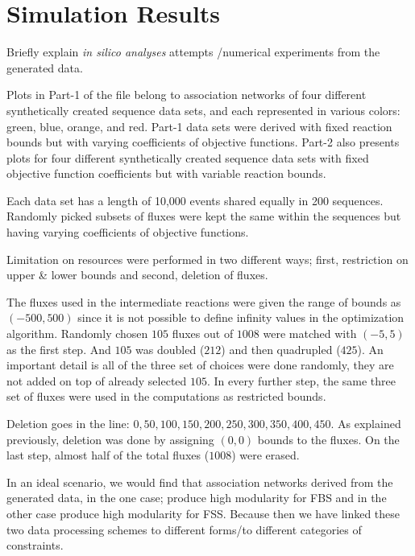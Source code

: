 \section{Simulation Results}
{\color{red} 
	
	Briefly explain \emph{in silico analyses} attempts /numerical experiments from the generated data.
	
	Plots in Part-1 of the file belong to association networks of four different synthetically created sequence data sets, and each represented in various colors: green, blue, orange, and red. Part-1 data sets were derived with fixed reaction bounds but with varying coefficients of objective functions. Part-2 also presents plots for four different synthetically created sequence data sets with fixed objective function coefficients but with variable reaction bounds.
	
	Each data set has a length of 10,000 events shared equally in 200 sequences. Randomly picked subsets of fluxes were kept the same within the sequences but having varying coefficients of objective functions.
	
	
	
	Limitation on resources were performed in two different ways; first, restriction on upper \& lower bounds and second, deletion of fluxes.
	
	The fluxes used in the intermediate reactions were given the range of bounds as $(-500, 500)$ since it is not possible to define infinity values in the optimization algorithm. Randomly chosen $105$ fluxes out of $1008$ were matched with $(-5, 5)$ as the first step. And $105$ was doubled ($212$) and then quadrupled ($425$). An important detail is all of the three set of choices were done randomly, they are not added on top of already selected $105$. In every further step, the same three set of fluxes were used in the computations as restricted bounds.
	
	Deletion goes in the line: $0, 50, 100, 150, 200, 250, 300, 350, 400, 450$. As explained previously, deletion was done by assigning $(0, 0)$ bounds to the fluxes. On the last step, almost half of the total fluxes ($1008$) were erased.
	
	In an ideal scenario, we would find that association networks derived from the generated data, in the one case; produce high modularity for FBS and in the other case produce high modularity for FSS. Because then we have linked these two data processing schemes to different forms/to different categories of constraints.
}

